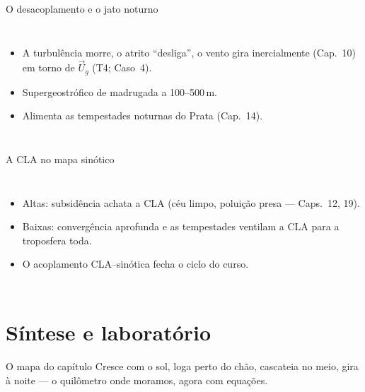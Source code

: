 \documentclass[aspectratio=169,11pt]{beamer}
\begin{document}
\begin{frame}{O desacoplamento e o jato noturno}
  \begin{columns}
    \vspace{0.4em}
    \begin{itemize}
      \item A turbulência morre, o atrito ``desliga'', o vento gira
            inercialmente (Cap.~10) em torno de $\vec U_g$ (T4;
            Caso~4).
      \item Supergeostrófico de madrugada a 100--500\,m.
      \item Alimenta as tempestades noturnas do Prata (Cap.~14).
    \end{itemize}
  \end{columns}
\end{frame}

\begin{frame}{A CLA no mapa sinótico}
  \begin{columns}
    \begin{itemize}
      \item Altas: subsidência achata a CLA (céu limpo, poluição
            presa — Caps.~12, 19).
      \item Baixas: convergência aprofunda e as tempestades
            \alert{ventilam} a CLA para a troposfera toda.
      \item O acoplamento CLA--sinótica fecha o ciclo do curso.
    \end{itemize}
  \end{columns}
\end{frame}

\section{Síntese e laboratório}

\begin{frame}{O mapa do capítulo}
  \vspace{0.6em}
  Cresce com o sol, loga perto do chão, cascateia no meio, gira à
  noite — o quilômetro onde moramos, agora com equações.
\end{frame}
\end{document}
